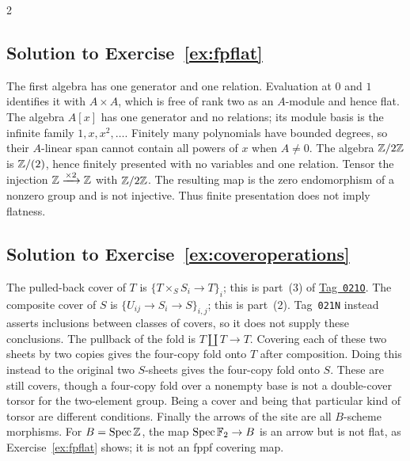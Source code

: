 \documentclass[12pt]{memoir}
\newcommand{\BGtag}[1]{\href{https://stacks.math.columbia.edu/tag/#1}{Tag~\texttt{#1}}}
\newcommand{\BGsolution}[1]{\subsection*{Solution to Exercise~\ref{#1}}\label{sol:#1}}
\begin{document}
\begin{multicols}{2}
\BGsolution{ex:fpflat}
The first algebra has one generator and one relation. Evaluation at
$0$ and $1$ identifies it with $A\times A$, which is free of rank
two as an $A$-module and hence flat. The algebra $A[x]$ has one
generator and no relations; its module basis is the infinite family
$1,x,x^2,\ldots$. Finitely many polynomials have bounded degrees,
so their $A$-linear span cannot contain all powers of $x$ when
$A\ne0$.
The algebra $\mathbb{Z}/2\mathbb{Z}$ is $\mathbb{Z}/(2)$, hence finitely presented with
no variables and one relation. Tensor the injection
$\mathbb{Z}\xrightarrow{\times2}\mathbb{Z}$ with $\mathbb{Z}/2\mathbb{Z}$. The resulting
map is the zero endomorphism of a nonzero group and is not injective.
Thus finite presentation does not imply flatness.

\BGsolution{ex:coveroperations}
The pulled-back cover of $T$ is
$\{T\times_S S_i\to T\}_i$; this is part~(3) of \BGtag{021O}.
The composite cover of $S$ is
$\{U_{ij}\to S_i\to S\}_{i,j}$; this is part~(2).
Tag~\texttt{021N} instead asserts inclusions between classes of
covers, so it does not supply these conclusions.
The pullback of the fold is $T\amalg T\to T$. Covering each of
these two sheets by two copies gives the four-copy fold onto $T$
after composition. Doing this instead to the original two $S$-sheets
gives the four-copy fold onto $S$. These are still covers, though a
four-copy fold over a nonempty base is not a double-cover torsor for
the two-element group. Being a cover and being that particular kind of torsor
are different conditions.
Finally the arrows of the site are all $B$-scheme morphisms.
For $B=\operatorname{Spec}\mathbb{Z}$, the map $\operatorname{Spec}\mathbb{F}_2\to B$ is an arrow but is
not flat, as Exercise~\ref{ex:fpflat} shows; it is not an fppf
covering map.


\end{multicols}
\end{document}

